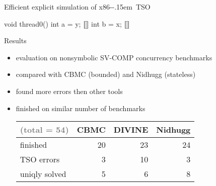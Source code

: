 \documentclass[aspectratio=169, fi]{paradise-slide}
\newcommand{\xtso}{\mbox{x86-\kern-.15em TSO}\xspace}
\begin{document}
\begin{frame}[fragile]{Efficient explicit simulation of \xtso}
\begin{minipage}[t]{0.35\textwidth}
  \newcommand{\ly}{\only<3->{\only<3>{\textcolor{frombuf}}{// \textrightarrow 2}}}
  \newcommand{\lx}{\only<5->{\only<5-6>{\textcolor{frombuf}}{// \textrightarrow 3}}}
  \begin{cppcode}
  void thread0() {
    int a = y; ⟦\ly⟧
    int b = x; ⟦\lx⟧
  }
  \end{cppcode}
  \end{minipage}
  \pause
  \begin{minipage}[t]{0.60\textwidth}
      \begin{itemize}
      \end{itemize}
  \end{minipage}
\end{frame}

\begin{frame}{Results}

  \begin{itemize}
    \item evaluation on nonsymbolic SV-COMP concurrency benchmarks
    \item compared with CBMC (bounded) and Nidhugg (stateless)
    \item found more errors then other tools
    \item finished on similar number of benchmarks

    \vspace{2ex}
    \setlength\tabcolsep{0.5em} %
    \begin{tabular}{lrrr} \toprule
        \textcolor{gray}{(total = 54)} & CBMC & \textbf{DIVINE} & Nidhugg \\ \midrule
        finished                & 20   & 23     & 24 \\
        TSO errors              &  3   & 10     &  3 \\
        uniqly solved           &  5   &  6     &  8 \\
        \bottomrule
    \end{tabular}
  \end{itemize}
\end{frame}
\end{document}
